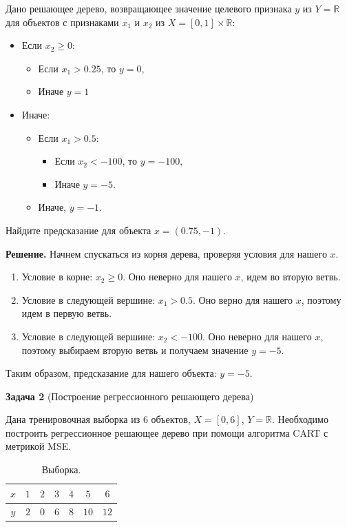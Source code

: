     Дано решающее дерево, возвращающее значение целевого признака $y$ из $Y = \mathbb{R}$ для объектов с признаками $x_1$ и $x_2$ из $X = [0, 1] \times \mathbb{R}$:
    \begin{itemize}
        \item Если $x_2 \geq 0$:
        \begin{itemize}
            \item Если $x_1 > 0.25$, то $y = 0$,
            \item Иначе $y = 1$
        \end{itemize}
        \item Иначе:
        \begin{itemize}
            \item Если $x_1 > 0.5$:
            \begin{itemize}
                \item Если $x_2 < -100$, то $y = -100$,
                \item Иначе $y = -5$.
            \end{itemize}
            \item Иначе, $y = -1$.
        \end{itemize}
    \end{itemize}

    Найдите предсказание для объекта $x = (0.75, -1)$.

    \textbf{Решение.}
    Начнем спускаться из корня дерева, проверяя условия для нашего $x$.
    \begin{enumerate}
        \item Условие в корне: $x_2 \geq 0$. Оно неверно для нашего $x$, идем во вторую ветвь.
        \item Условие в следующей вершине: $x_1 > 0.5$. Оно верно для нашего $x$, поэтому идем в первую ветвь.
        \item Условие в следующей вершине: $x_2 < -100$. Оно неверно для нашего $x$, поэтому выбираем вторую ветвь и получаем значение $y = -5$.
    \end{enumerate}

    Таким образом, предсказание для нашего объекта: $y = -5$.
    
    
\textbf{Задача 2} (Построение регрессионного решающего дерева)
    
    Дана тренировочная выборка из 6 объектов, $X = [0, 6]$, $Y = \mathbb{R}$. Необходимо построить регрессионное решающее дерево при помощи алгоритма CART с метрикой MSE.
    \begin{table}[h]
    \centering
    \caption{Выборка.}
    \begin{tabular}{|c|c|c|c|c|c|c|}
    \hline
    $x$ & $1$ & $2$ & $3$ & $4$ & $5$ & $6$ \\
    \hline
    $y$ & $2$ & $0$ & $6$ & $8$ & $10$ & $12$ \\
    \hline
    \end{tabular}
    \end{table}

